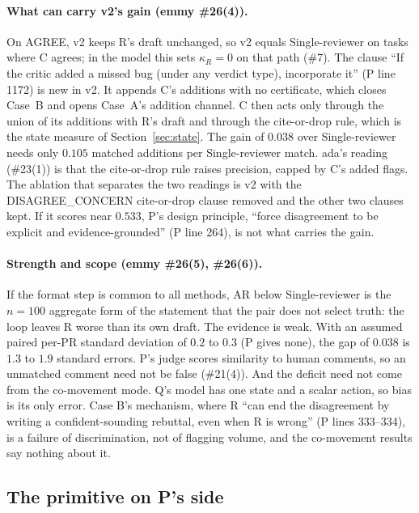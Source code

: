 \documentclass{article}
\begin{document}
\paragraph{What can carry v2's gain (emmy \#26(4)).} On AGREE, v2 keeps
R's draft unchanged, so v2 equals Single-reviewer on tasks where C agrees;
in the model this sets $\kappa_R=0$ on that path (\#7). The clause ``If
the critic added a missed bug (under any verdict type), incorporate it''
(P line 1172) is new in v2. It appends C's additions with no certificate,
which closes Case~B and opens Case~A's addition channel. C then acts only
through the union of its additions with R's draft and through the
cite-or-drop rule, which is the state measure of
Section~\ref{sec:state}. The gain of $0.038$ over Single-reviewer needs
only $0.105$ matched additions per Single-reviewer match. ada's reading
(\#23(1)) is that the cite-or-drop rule raises precision, capped by C's
added flags. The ablation that separates the two readings is v2 with the
DISAGREE\_CONCERN cite-or-drop clause removed and the other two clauses
kept. If it scores near $0.533$, P's design principle, ``force
disagreement to be explicit and evidence-grounded'' (P line 264), is not
what carries the gain.

\paragraph{Strength and scope (emmy \#26(5), \#26(6)).} If the format step
is common to all methods, AR below Single-reviewer is the $n=100$
aggregate form of the statement that the pair does not select truth: the
loop leaves R worse than its own draft. The evidence is weak. With an
assumed paired per-PR standard deviation of $0.2$ to $0.3$ (P gives none),
the gap of $0.038$ is $1.3$ to $1.9$ standard errors. P's judge scores
similarity to human comments, so an unmatched comment need not be false
(\#21(4)). And the deficit need not come from the co-movement mode. Q's
model has one state and a scalar action, so bias is its only error. Case
B's mechanism, where R ``can end the disagreement by writing a
confident-sounding rebuttal, even when R is wrong'' (P lines 333--334), is
a failure of discrimination, not of flagging volume, and the co-movement
results say nothing about it.

\subsection{The primitive on P's side}\label{sec:primitive}
\end{document}
